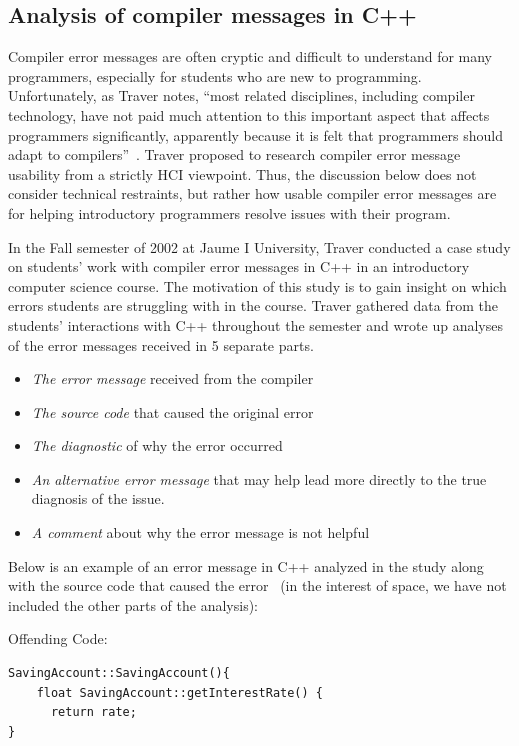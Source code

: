 \documentclass{sig-alternate}
\begin{document}
\subsection{Analysis of compiler messages in C++}\label{subsec:compiler analysis}

Compiler error messages are often cryptic and difficult to understand for many programmers, especially for students who are new to programming.
Unfortunately, as Traver notes, ``most related disciplines, including compiler technology, have not paid much attention to this important aspect that affects programmers significantly, apparently because it is felt that programmers should adapt to compilers''~\cite{Traver:2010}.
Traver proposed to research compiler error message usability from a strictly HCI viewpoint.
Thus, the discussion below does not consider technical restraints, but rather how usable compiler error messages are for helping introductory programmers resolve issues with their program.

In the Fall semester of 2002 at Jaume I University, Traver conducted a case study on students' work with compiler error messages in C++ in an introductory computer science course.
The motivation of this study is to gain insight on which errors students are struggling with in the course.
Traver gathered data from the students' interactions with C++ throughout the semester and wrote up analyses of the error messages received in 5 separate parts.
\begin{itemize}
	\item \textit{The error message} received from the compiler
	\item \textit{The source code} that caused the original error
	\item \textit{The diagnostic} of why the error occurred
	\item \textit{An alternative error message} that may help lead more directly to the true diagnosis of the issue.
	\item \textit{A comment} about why the error message is not helpful
\end{itemize}

Below is an example of an error message in C++ analyzed in the study along with the source code that caused the error~\cite{Traver:2010} (in the interest of space, we have not included the other parts of the analysis):

Offending Code:
\begin{verbatim}
SavingAccount::SavingAccount(){
    float SavingAccount::getInterestRate() {
   	  return rate;
}
\end{verbatim}
\end{document}
